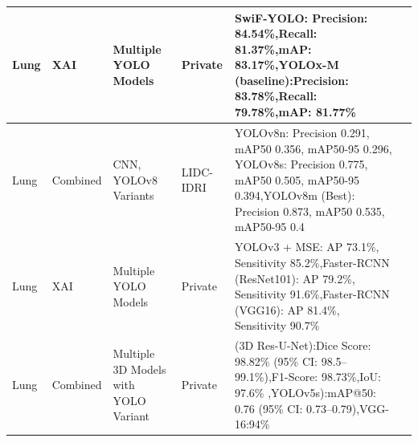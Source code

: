 \begin{center}
\begin{longtable}{|p{1cm}|p{1.5cm}|p{2cm}|p{1.8cm}|p{5cm}|p{1.2cm}|}
		Lung & XAI & Multiple YOLO Models & Private & SwiF-YOLO: Precision: 84.54\%,Recall: 81.37\%,mAP: 83.17\%,YOLOx-M (baseline):Precision: 83.78\%,Recall: 79.78\%,mAP: 81.77\%
		& \cite{article1} \\
		\hline
		
		Lung & Combined & CNN, YOLOv8 Variants & LIDC-IDRI & YOLOv8n: Precision 0.291, mAP50 0.356, mAP50-95 0.296, YOLOv8s: Precision 0.775, mAP50 0.505, mAP50-95 0.394,YOLOv8m (Best): Precision 0.873, mAP50 0.535, mAP50-95 0.4
		& \cite{article2} \\
		\hline
		
		Lung & XAI & Multiple YOLO Models & Private & YOLOv3 + MSE: AP 73.1\%, Sensitivity 85.2\%,Faster-RCNN (ResNet101): AP 79.2\%, Sensitivity 91.6\%,Faster-RCNN (VGG16): AP 81.4\%, Sensitivity 90.7\%
		& \cite{inproceedings1} \\
		\hline
		
		Lung & Combined & Multiple 3D Models with YOLO Variant & Private & (3D Res-U-Net):Dice Score: 98.82\% (95\% CI: 98.5–99.1\%),F1-Score: 98.73\%,IoU: 97.6\% ,YOLOv5s):mAP@50: 0.76 (95\% CI: 0.73–0.79),VGG-16:94\%
		& \cite{Shuvo_2026} \\
		\hline
		

\end{longtable}
\end{center}
